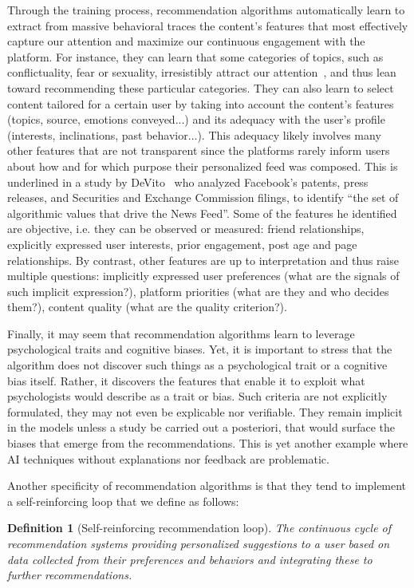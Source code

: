 \documentclass[10pt]{article}
\newtheorem{definition}{Definition}[section]
\begin{document}
Through the training process, recommendation algorithms automatically learn to extract from massive behavioral traces the content's features that most effectively capture our attention and maximize our continuous engagement with the platform.
For instance, they can learn that some categories of topics, such as conflictuality, fear or sexuality, irresistibly attract our attention~\cite{bronner2021}, and thus lean toward recommending these particular categories.
%
They can also learn to select content tailored for a certain user by taking into account the content's features (topics, source, emotions conveyed...) and its adequacy with the user's profile (interests, inclinations, past behavior...). 
This adequacy likely involves many other features that are not transparent since the platforms rarely inform users about how and for which purpose their personalized feed was composed.
%
This is underlined in a study by DeVito~\cite{devito2017editors} who analyzed Facebook’s patents, press releases, and Securities and Exchange Commission filings, to identify ``the set of algorithmic values that drive the News Feed''.
Some of the features he identified are objective, i.e. they can be observed or measured: friend relationships, explicitly expressed user interests, prior engagement, post age and page relationships.
By contrast, other features are up to interpretation and thus raise multiple questions: implicitly expressed user preferences (what are the signals of such implicit expression?), platform priorities (what are they and who decides them?), content quality (what are the quality criterion?).

Finally, it may seem that recommendation algorithms learn to leverage psychological traits and cognitive biases. Yet, it is important to stress that the algorithm does not discover such things as a psychological trait or a cognitive bias itself.
Rather, it discovers the features that enable it to exploit what psychologists would describe as a trait or bias.
Such criteria are not explicitly formulated, they may not even be explicable nor verifiable. They remain implicit in the models unless a study be carried out a posteriori, that would surface the biases that emerge from the recommendations.
This is yet another example where AI techniques without explanations nor feedback are problematic.

Another specificity of recommendation algorithms is that they tend to implement a self-reinforcing loop that we define as follows:

\begin{definition}[Self-reinforcing recommendation loop]\label{def:rec_loop}
  The continuous cycle of recommendation systems providing personalized suggestions to a user based on data collected from their preferences and behaviors and integrating these to further recommendations.
\end{definition}
\end{document}
